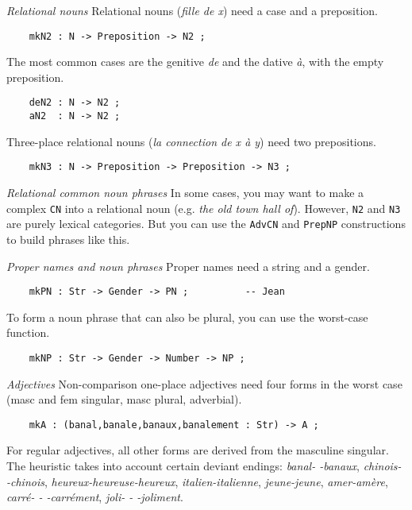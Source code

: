 \documentclass[11pt,a4paper]{article}
\newcommand{\subsubsubsection}[1]{\textit{#1}}
\begin{document}
\subsubsubsection{Relational nouns}
Relational nouns (\textit{fille de x}) need a case and a preposition. 

\begin{verbatim}
    mkN2 : N -> Preposition -> N2 ;
\end{verbatim}

The most common cases are the genitive \textit{de} and the dative \textit{à}, 
with the empty preposition.

\begin{verbatim}
    deN2 : N -> N2 ;
    aN2  : N -> N2 ;
\end{verbatim}

Three-place relational nouns (\textit{la connection de x à y}) need two prepositions.

\begin{verbatim}
    mkN3 : N -> Preposition -> Preposition -> N3 ;
\end{verbatim}

\subsubsubsection{Relational common noun phrases}
In some cases, you may want to make a complex \texttt{CN} into a
relational noun (e.g. \textit{the old town hall of}). However, \texttt{N2} and
\texttt{N3} are purely lexical categories. But you can use the \texttt{AdvCN}
and \texttt{PrepNP} constructions to build phrases like this.

\subsubsubsection{Proper names and noun phrases}
Proper names need a string and a gender.

\begin{verbatim}
    mkPN : Str -> Gender -> PN ;          -- Jean
\end{verbatim}

To form a noun phrase that can also be plural,
you can use the worst-case function.

\begin{verbatim}
    mkNP : Str -> Gender -> Number -> NP ; 
\end{verbatim}

\subsubsubsection{Adjectives}
Non-comparison one-place adjectives need four forms in the worst
case (masc and fem singular, masc plural, adverbial).

\begin{verbatim}
    mkA : (banal,banale,banaux,banalement : Str) -> A ;
\end{verbatim}

For regular adjectives, all other forms are derived from the
masculine singular. The heuristic takes into account certain
deviant endings: \textit{banal- -banaux}, \textit{chinois- -chinois}, 
\textit{heureux-heureuse-heureux}, \textit{italien-italienne}, \textit{jeune-jeune},
\textit{amer-amère}, \textit{carré- - -carrément}, \textit{joli- - -joliment}.
\end{document}
